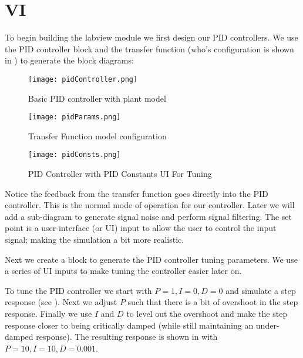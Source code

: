 \documentclass[main.tex]{subfile}
\begin{document}
\section{\Labview VI} 
\label{sec:labview_vi}

To begin building the labview module we first design our PID controllers. We use
the PID controller block and the transfer function (who's configuration is shown
in ) to generate the block diagrams:

\begin{figure}[h]
	\begin{center}
		\texttt{[image: pidController.png]}
	\end{center}
	\caption{Basic PID controller with plant model}
	\label{fig:pidController}
\end{figure}

\begin{figure}[h]
	\begin{center}
		\texttt{[image: pidParams.png]}
	\end{center}
	\caption{Transfer Function model configuration}
	\label{fig:pidParams}
\end{figure}

\begin{figure}[h]
	\begin{center}
		\texttt{[image: pidConsts.png]}
	\end{center}
	\caption{PID Controller with PID Constants UI For Tuning}
	\label{fig:pidConsts}
\end{figure}


Notice the feedback from the transfer function goes directly into the PID
controller. This is the normal mode of operation for our controller. Later we
will add a sub-diagram to generate signal noise and perform signal filtering. The
set point is a user-interface (or UI) input to allow the user to control the
input signal; making the simulation a bit more realistic.

Next we create a block to generate the PID controller tuning parameters. We use
a series of UI inputs to make tuning the controller easier later on.

To tune the PID controller we start with $P=1, I=0, D=0$ and simulate a step
response (see ).  Next we adjust $P$ such that there is a bit
of overshoot in the step response. Finally we use $I$ and $D$ to level out the
overshoot and make the step response closer to being critically damped (while
still maintaining an under-damped response). The resulting response is shown in
 with $P=10, I=10, D=0.001$.
\end{document}
